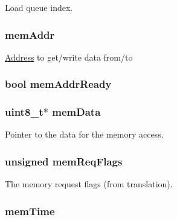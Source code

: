 \label{classInOrderDynInst_a543896e8c656ce7cce978a1ec4d29afe}
Load queue index. \hypertarget{classInOrderDynInst_ae5b093c34f706d06da52bf675cde59b7}{
\subsubsection[{memAddr}]{ {\bf memAddr}}}
\label{classInOrderDynInst_ae5b093c34f706d06da52bf675cde59b7}
\hyperlink{classAddress}{Address} to get/write data from/to \hypertarget{classInOrderDynInst_a5221fc01c16ee159462069b0e45a4159}{
\subsubsection[{memAddrReady}]{\setlength{\rightskip}{0pt plus 5cm}bool {\bf memAddrReady}}}
\label{classInOrderDynInst_a5221fc01c16ee159462069b0e45a4159}
\hypertarget{classInOrderDynInst_a9c9a186aff5eddf449916952b8398116}{
\subsubsection[{memData}]{\setlength{\rightskip}{0pt plus 5cm}uint8\_\-t$\ast$ {\bf memData}}}
\label{classInOrderDynInst_a9c9a186aff5eddf449916952b8398116}
Pointer to the data for the memory access. \hypertarget{classInOrderDynInst_aba29e5174ccb47ac17cc2ff228a8e2af}{
\subsubsection[{memReqFlags}]{\setlength{\rightskip}{0pt plus 5cm}unsigned {\bf memReqFlags}}}
\label{classInOrderDynInst_aba29e5174ccb47ac17cc2ff228a8e2af}
The memory request flags (from translation). \hypertarget{classInOrderDynInst_aaab230be315fbb99b9c86db93dd06519}{
\subsubsection[{memTime}]{ {\bf memTime}}}
